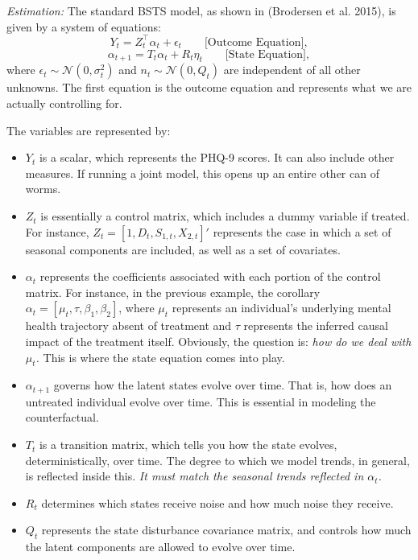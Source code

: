 \documentclass[12pt,letterpaper,doublespace, oneside]{article}
\begin{document}
\noindent

\emph{Estimation:} The standard BSTS model, as shown in (Brodersen et al. 2015), is given by a system of equations: 
\[
Y_t = Z_t^\top \alpha_t + \epsilon_t \qquad \text{[Outcome Equation]},
\]
\[
\alpha_{t+1} = T_t \alpha_t + R_t \eta_t \qquad \text{[State Equation]},
\]
where $\epsilon_t \sim \mathcal{N}(0,\sigma_t^2)$ and $n_t \sim \mathcal{N}(0,Q_t)$ are independent of all other unknowns. The first equation is the outcome equation and represents what we are actually controlling for. 

The variables are represented by: 
\begin{itemize}
\item $Y_t$ is a scalar, which represents the PHQ-9 scores. It can also include other measures. If running a joint model, this opens up an entire other can of worms.  

\item $Z_t$ is essentially a control matrix, which includes a dummy variable if treated. For instance, $Z_t = [1,D_t, S_{1,t}, X_{2,t}]'$ represents the case in which a set of seasonal components are included, as well as a set of covariates. 

\item $\alpha_t$ represents the coefficients associated with each portion of the control matrix. For instance, in the previous example, the corollary $\alpha_t = [\mu_t, \tau, \beta_1, \beta_2]$, where $\mu_t$ represents an individual's underlying mental health trajectory absent of treatment and $\tau$ represents the inferred causal impact of the treatment itself. Obviously, the question is: \emph{how do we deal with $\mu_t$.} This is where the state equation comes into play. 

\item $\alpha_{t+1}$ governs how the latent states evolve over time. That is, how does an untreated individual evolve over time. This is essential in modeling the counterfactual. 

\item $T_t$ is a transition matrix, which tells you how the state evolves, deterministically, over time. The degree to which we model trends, in general, is reflected inside this. \emph{It must match the seasonal trends reflected in $\alpha_t$.}

\item $R_t$ determines which states receive noise and how much noise they receive. 

\item $Q_t$ represents the state disturbance covariance matrix, and controls how much the latent components are allowed to evolve over time.

\end{itemize}
\end{document}
